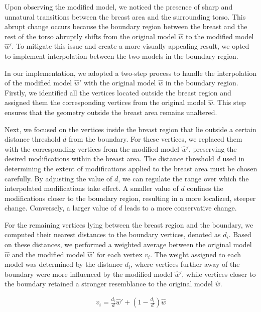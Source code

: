 Upon observing the modified model, we noticed the presence of sharp and unnatural transitions between the breast area and the surrounding torso. This abrupt change occurs because the boundary 
region between the breast and the rest of the torso abruptly shifts from the original model $\hat{w}$ to the modified model $\hat{w}'$. To mitigate this issue and create a more visually 
appealing result, we opted to implement interpolation between the two models in the boundary region.

In our implementation, we adopted a two-step process to handle the interpolation of the modified model $\hat{w}'$ with the original model $\hat{w}$ in the boundary region. Firstly, 
we identified all the vertices located outside the breast region and assigned them the corresponding vertices from the original model $\hat{w}$. This step ensures that the geometry 
outside the breast area remains unaltered.

Next, we focused on the vertices inside the breast region that lie outside a certain distance threshold $d$ from the boundary. For these vertices, we replaced them with the corresponding 
vertices from the modified model $\hat{w}'$, preserving the desired modifications within the breast area. The distance threshold $d$ used in determining the extent of 
modifications applied to the breast area must be chosen carefully. By adjusting the value of $d$, we can regulate the range over which the interpolated modifications take effect. 
A smaller value of $d$ confines the modifications closer to the boundary region, resulting in a more localized, steeper change. Conversely, a larger value of $d$ leads to a more conservative
change.

For the remaining vertices lying between the breast region and the boundary, we computed their nearest distances to the boundary vertices, denoted as $d_i$. Based on these distances, 
we performed a weighted average between the original model $\hat{w}$ and the modified model $\hat{w}'$ for each vertex $v_i$. The weight assigned to each model was determined by the 
distance $d_i$, where vertices further away of the boundary were more influenced by the modified model $\hat{w}'$, while vertices closer to the boundary retained a stronger resemblance to the 
original model $\hat{w}$.

\begin{align}\label{eq:interpolation}
    v_i = \frac{d_i}{d} \hat{w} ' + \left(1 - \frac{d_i}{d}\right) \hat{w}
\end{align}

